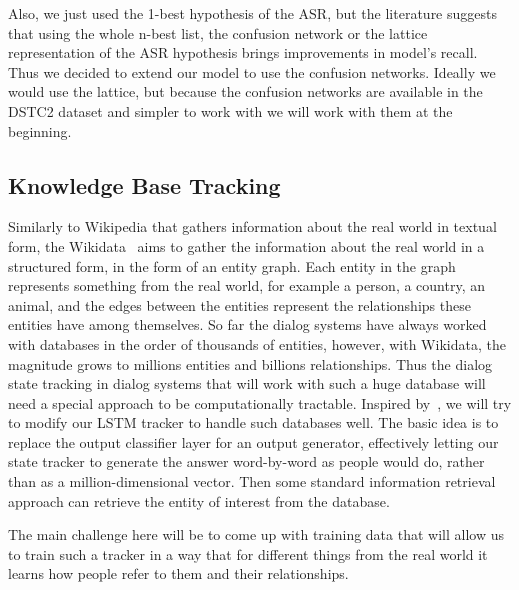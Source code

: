 \documentclass[runningheads,a4paper]{llncs}
\begin{document}
Also, we just used the 1-best hypothesis of the ASR, but the literature suggests that using the whole n-best list, the confusion network or the lattice representation of the ASR hypothesis brings improvements in model's recall. Thus we decided to extend our model to use the confusion networks. Ideally we would use the lattice, but because the confusion networks are available in the DSTC2 dataset and simpler to work with we will work with them at the beginning.

\subsection{Knowledge Base Tracking}
Similarly to Wikipedia that gathers information about the real world in textual form, the Wikidata~\cite{vrandevcic2012wikidata} aims to gather the information about the real world in a structured form, in the form of an entity graph. Each entity in the graph represents something from the real world, for example a person, a country, an animal, and the edges between the entities represent the relationships these entities have among themselves. So far the dialog systems have always worked with databases in the order of thousands of entities, however, with Wikidata, the magnitude grows to millions entities and billions relationships. Thus the dialog state tracking in dialog systems that will work with such a huge database will need a special approach to be computationally tractable. Inspired by~\cite{sutskever2014sequence}, we will try to modify our LSTM tracker to handle such databases well. The basic idea is to replace the output classifier layer for an output generator, effectively letting our state tracker to generate the answer word-by-word as people would do, rather than as a million-dimensional vector. Then some standard information retrieval approach can retrieve the entity of interest from the database.

The main challenge here will be to come up with training data that will allow us to train such a tracker in a way that for different things from the real world it learns how people refer to them and their relationships.








\end{document}
